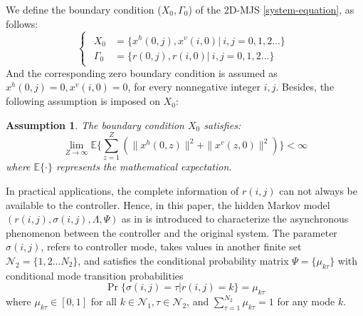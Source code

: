 \documentclass[journal,final,twocolumn]{IEEEtran}
\newtheorem{assumption}{Assumption}
\begin{document}
	We define the boundary condition ($X_{0},\varGamma_{0}$) of the 2D-MJS \eqref{system-equation}, as follows:
	\begin{equation} \label{boundary-condition}
	\left\{
		\begin{array}{lr}
			\begin{split}
				X_{0} &= \{x^{h}(0,j),x^{v}(i,0)|\ i,j = 0,1,2...\}\\
				\varGamma_{0} &= \{r(0,j), r(i,0)|\ i,j = 0,1,2... \}
			\end{split}
		\end{array}
	\right.
	\end{equation}
	And the corresponding zero boundary condition is assumed as $x^{h}(0,j) =0, x^{v}(i,0)=0$, for every nonnegative integer $i,j$. Besides, the following assumption is imposed on $X_{0}$:
	
	\begin{assumption}\label{boundary-assumptin}
	 	The boundary condition $X_{0}$ satisfies:
	 	\begin{equation}
	 		\lim\limits_{Z\to\infty}\mathbb{E}\Big\{\sum_{z=1}^{Z}(\|x^{h}(0,z)\|^{2}+ \|x^{v}(z,0)\|^{2})\Big\} < \infty
	 	\end{equation}
	 	where $\mathbb{E}\{\cdot\}$ represents the mathematical expectation.
	\end{assumption}
	
	In practical applications, the complete information of $r(i,j)$ can not always be available to the controller. Hence, in this paper, the hidden Markov model $(r(i,j),\sigma(i,j),\varLambda,\varPsi)$ as in \cite{wu2016passivity} is introduced to characterize the asynchronous phenomenon between the controller and the original system. The parameter $\sigma(i,j)$, refers to controller mode, takes values in another finite set $\mathcal{N}_{2} = \{1,2...N_{2}\}$, and satisfies the conditional probability matrix $\varPsi=\{\mu_{k\tau }\}$ with conditional mode transition probabilities
	\begin{equation}
		\Pr\{\sigma(i,j)=\tau|r(i,j)=k\}=\mu_{k\tau } %
	\end{equation}
	where $\mu_{k\tau }\in[0,1]$ for all $k\in\mathcal{N}_{1}, \tau\in\mathcal{N}_{2}$, and $\sum_{\tau =1}^{N_{2}}\mu_{k\tau } = 1$ for any mode $k$.
	
\end{document}
